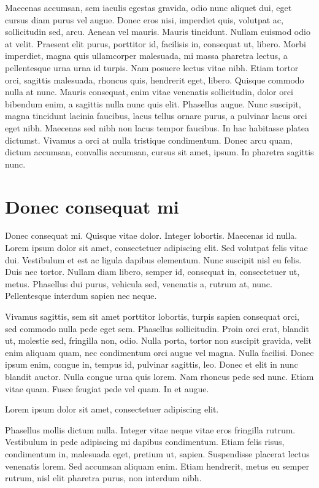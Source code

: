 \documentclass[../hdr.tex]{subfiles}
\begin{document}
Maecenas accumsan, sem iaculis egestas gravida, odio nunc aliquet dui, eget
cursus diam purus vel augue. Donec eros nisi, imperdiet quis, volutpat ac,
sollicitudin sed, arcu. Aenean vel mauris. Mauris tincidunt. Nullam euismod odio
at velit. Praesent elit purus, porttitor id, facilisis in, consequat ut, libero.
Morbi imperdiet, magna quis ullamcorper malesuada, mi massa pharetra lectus, a
pellentesque urna urna id turpis. Nam posuere lectus vitae nibh. Etiam tortor
orci, sagittis malesuada, rhoncus quis, hendrerit eget, libero. Quisque commodo
nulla at nunc. Mauris consequat, enim vitae venenatis sollicitudin, dolor orci
bibendum enim, a sagittis nulla nunc quis elit. Phasellus augue. Nunc suscipit,
magna tincidunt lacinia faucibus, lacus tellus ornare purus, a pulvinar lacus
orci eget nibh. Maecenas sed nibh non lacus tempor faucibus. In hac habitasse
platea dictumst. Vivamus a orci at nulla tristique condimentum. Donec arcu quam,
dictum accumsan, convallis accumsan, cursus sit amet, ipsum. In pharetra
sagittis nunc.

\section{Donec consequat mi}

Donec consequat mi. Quisque vitae dolor. Integer lobortis. Maecenas id nulla.
Lorem ipsum dolor sit amet, consectetuer adipiscing elit. Sed volutpat felis
vitae dui. Vestibulum et est ac ligula dapibus elementum. Nunc suscipit nisl eu
felis. Duis nec tortor. Nullam diam libero, semper id, consequat in,
consectetuer ut, metus. Phasellus dui purus, vehicula sed, venenatis a, rutrum
at, nunc. Pellentesque interdum sapien nec neque.

Vivamus sagittis, sem sit amet porttitor lobortis, turpis sapien consequat orci,
sed commodo nulla pede eget sem. Phasellus sollicitudin. Proin orci erat,
blandit ut, molestie sed, fringilla non, odio. Nulla porta, tortor non suscipit
gravida, velit enim aliquam quam, nec condimentum orci augue vel magna. Nulla
facilisi. Donec ipsum enim, congue in, tempus id, pulvinar sagittis, leo. Donec
et elit in nunc blandit auctor. Nulla congue urna quis lorem. Nam rhoncus pede
sed nunc. Etiam vitae quam. Fusce feugiat pede vel quam. In et augue.

Lorem ipsum dolor sit amet, consectetuer adipiscing elit.

Phasellus mollis dictum nulla. Integer vitae neque vitae eros fringilla rutrum.
Vestibulum in pede adipiscing mi dapibus condimentum. Etiam felis risus,
condimentum in, malesuada eget, pretium ut, sapien. Suspendisse placerat lectus
venenatis lorem. Sed accumsan aliquam enim. Etiam hendrerit, metus eu semper
rutrum, nisl elit pharetra purus, non interdum nibh.



\ifSubfilesClassLoaded{%
\listoftodos
\clearpage
  \printbibliography
}{%
}
\end{document}

